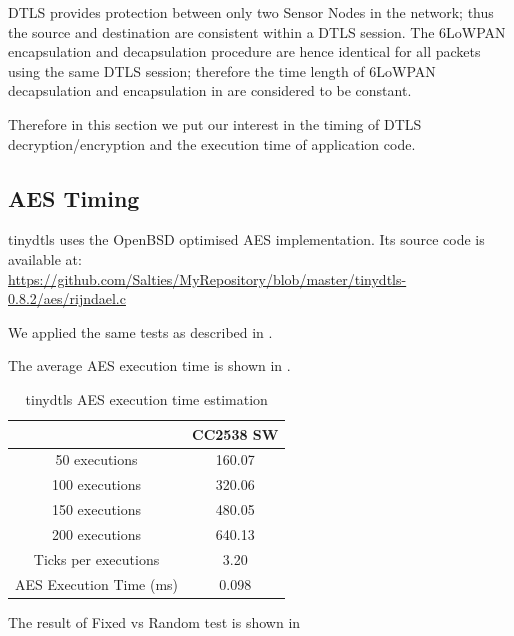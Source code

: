 DTLS provides protection between only two Sensor Nodes in the network; thus the source and destination are consistent within a DTLS session. The 6LoWPAN encapsulation and decapsulation procedure are hence identical for all packets using the same DTLS session; therefore the time length of 6LoWPAN decapsulation and encapsulation in  are considered to be constant.

Therefore in this section we put our interest in the timing of DTLS decryption/encryption and the execution time of application code.

\subsection{AES Timing} \label{tinydtls AES Timing}

tinydtls uses the OpenBSD optimised AES implementation. Its source code is available at:\\ 
\url{https://github.com/Salties/MyRepository/blob/master/tinydtls-0.8.2/aes/rijndael.c}

We applied the same tests as described in . 

The average AES execution time is shown in .

\begin{table}[ht!]
	\center
	\begin{tabular}{|c|c|}
		\hline
		                        & CC2538 SW \\ \hline
		50 executions           & 160.07          \\ \hline
		100 executions          & 320.06          \\ \hline
		150 executions          & 480.05          \\ \hline
		200 executions          & 640.13          \\ \hline
		Ticks per executions    & 3.20            \\ \hline
		AES Execution Time (ms) & 0.098           \\ \hline
	\end{tabular}
	\caption{tinydtls AES execution time estimation}
	\label{Tbl: tinydtls AES execution time estimation}
\end{table}

The result of Fixed vs Random test is shown in 

